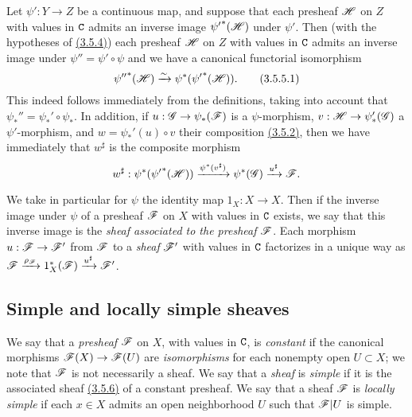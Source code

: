 \begin{env}[3.5.5]
\label{env-0.3.5.5}
Let $\psi':Y\to Z$ be a continuous map, and suppose that each presheaf $\mathscr{H}$
on $Z$ with values in $\mathtt{C}$ admits an inverse image ${\psi'}^*(\mathscr{H})$ under
$\psi'$. Then (with the hypotheses of \hyperref[env-0.3.5.4]{(3.5.4)}) each presheaf $\mathscr{H}$
on $Z$ with values in $\mathtt{C}$ admits an inverse image under $\psi''=\psi'\circ\psi$
and we have a canonical functorial isomorphism
\[
  {\psi''}^*(\mathscr{H})\xrightarrow{\sim}\psi^*({\psi'}^*(\mathscr{H})).
  \tag{3.5.5.1}
\]
This indeed follows immediately from the definitions, taking into account that
$\psi_*''=\psi_*'\circ\psi_*$. In addition, if $u:\mathscr{G}\to\psi_*(\mathscr{F})$ is a
$\psi$-morphism, $v:\mathscr{H}\to\psi_*'(\mathscr{G})$ a $\psi'$-morphism, and
$w=\psi_*'(u)\circ v$ their composition \hyperref[env-0.3.5.2]{(3.5.2)}, then we have
immediately that $w^\sharp$ is the composite morphism
\[
  w^\sharp:\psi^*({\psi'}^*(\mathscr{H}))\xrightarrow{\psi^*(v^\sharp)}\psi^*(\mathscr{G})
  \xrightarrow{u^\sharp}\mathscr{F}.
\]
\end{env}

\begin{env}[3.5.6]
\label{env-0.3.5.6}
We take in particular for $\psi$ the identity map $1_X:X\to X$. Then if the
inverse image under $\psi$ of a presheaf $\mathscr{F}$ on $X$ with values in $\mathtt{C}$
exists, we say that this inverse image is the {\em sheaf associated to the
presheaf $\mathscr{F}$}. Each morphism $u:\mathscr{F}\to\mathscr{F}'$ from $\mathscr{F}$ to a
{\em sheaf} $\mathscr{F}'$ with values in $\mathtt{C}$ factorizes in a unique way as
$\mathscr{F}\xrightarrow{\rho_\mathscr{F}}1_X^*(\mathscr{F})\xrightarrow{u^\sharp}\mathscr{F}'$.
\end{env}

\subsection{Simple and locally simple sheaves}
\label{subsection-simple-and-locally-simple-sheaves}

\begin{env}[3.6.1]
\label{env-0.3.6.1}
We say that a {\em presheaf} $\mathscr{F}$ on $X$, with values in $\mathtt{C}$, is
{\em constant} if the canonical morphisms $\mathscr{F}(X)\to\mathscr{F}(U)$ are
{\em isomorphisms} for each nonempty open $U\subset X$; we note that $\mathscr{F}$
is not necessarily a sheaf. We say that a {\em sheaf} is {\em simple} if it is
the associated sheaf \hyperref[env-0.3.5.6]{(3.5.6)} of a constant presheaf. We say that a
sheaf $\mathscr{F}$ is {\em locally simple} if each $x\in X$ admits an open
neighborhood $U$ such that $\mathscr{F}|U$ is simple.
\end{env}

